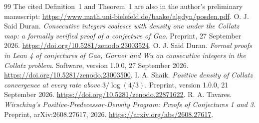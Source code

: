 \documentclass[11pt,a4paper]{article}
\begin{document}
\begin{thebibliography}{99}
The cited Definition~1 and Theorem~1 are also in the author's
preliminary manuscript:
\url{https://www.math.uni-bielefeld.de/baake/algdyn/posden.pdf}.
 O. J. Said Duran.
\emph{Consecutive integers coalesce with density one under the Collatz
map: a formally verified proof of a conjecture of Gao}.
Preprint, 27 September 2026.
\url{https://doi.org/10.5281/zenodo.23003524}.
 O. J. Said Duran.
\emph{Formal proofs in Lean 4 of conjectures of Gao, Garner and Wu on
consecutive integers in the Collatz problem}.
Software, version 1.0.0, 27 September 2026.
\url{https://doi.org/10.5281/zenodo.23003500}.
 I. A. Shaik.
\emph{Positive density of Collatz convergence at every rate above
\(3/\log(4/3)\)}.
Preprint, version 1.0.0, 21 September 2026.
\url{https://doi.org/10.5281/zenodo.22871622}.
 R. A. Tavares.
\emph{Wirsching's Positive-Predecessor-Density Program:
Proofs of Conjectures 1 and 3}.
Preprint, arXiv:2608.27617, 2026.
\url{https://arxiv.org/abs/2608.27617}.
\end{thebibliography}
\end{document}
